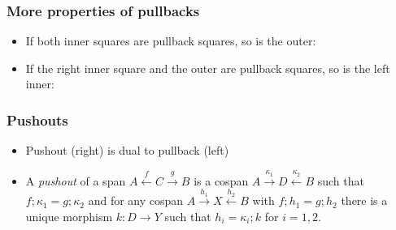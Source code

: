 \documentclass[handout]{beamer}
\begin{document}
\frame
  {   
    \frametitle{More properties of pullbacks}\label{Ch4:PullbPropMore}

 \begin{itemize}[<+->]
\item If both inner squares are pullback squares, so is the outer:
\item If the right inner square and the outer are pullback squares, so is the left inner:
 \end{itemize}

 }

\frame
  {   
    \frametitle{Pushouts}\label{Ch4:Push}

 \begin{itemize}[<+->]
\item Pushout (right) is dual to pullback (left)
\item A \emph{pushout} of a span
$A\stackrel{f}{\leftarrow} C \stackrel{g}{\to}B$
is a cospan $A\stackrel{\kappa_1}{\to} D \stackrel{\kappa_2}{\leftarrow}B$ such that 
$f;\kappa_1=g;\kappa_2$ and for any cospan 
$A\stackrel{h_1}{\to} X \stackrel{h_2}{\leftarrow}B$
with $f;h_1 = g;h_2$
there is a unique morphism $k: D\to Y$
such that $h_i = \kappa_i;k$ for $i=1,2$.
 \end{itemize}

 }
\end{document}
